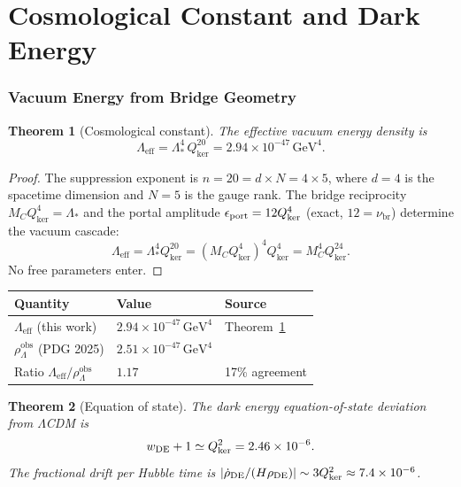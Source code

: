 \documentclass[12pt]{article}
\theoremstyle{plain}
\newtheorem{theorem}{Theorem}[section]
\theoremstyle{definition}
\numberwithin{equation}{section}
\newcommand{\br}{\mathrm{br}}
\newcommand{\eff}{\mathrm{eff}}
\newcommand{\obs}{\mathrm{obs}}
\begin{document}
\part{Cosmological Constant and Dark Energy}

\section{Vacuum Energy from Bridge Geometry}\label{sec:cosmo}

\begin{theorem}[Cosmological constant]\label{thm:cosmo}
The effective vacuum energy density is
\[
\boxed{\Lambda_\eff = \Lambda_*^4\, Q_{\ker}^{20}
= 2.94\times10^{-47}\,\mathrm{GeV}^4.}
\]
\end{theorem}

\begin{proof}
The suppression exponent is $n=20=d\times N=4\times5$, where $d=4$ is
the spacetime dimension and $N=5$ is the gauge rank.  The bridge reciprocity
$M_C Q_{\ker}^4=\Lambda_*$ and the portal amplitude $\epsilon_{\rm port}=
12Q_{\ker}^4$ (exact, $12=\nu_\br$) determine the vacuum cascade:
\[
\Lambda_\eff = \Lambda_*^4 Q_{\ker}^{20}
= (M_C Q_{\ker}^4)^4 Q_{\ker}^4 = M_C^4 Q_{\ker}^{24}.
\]
No free parameters enter.
\end{proof}

\begin{center}
\begin{tabular}{lll}
\toprule
Quantity & Value & Source\\
\midrule
$\Lambda_\eff$ (this work) & $2.94\times10^{-47}\,\mathrm{GeV}^4$ & Theorem~\ref{thm:cosmo}\\
$\rho_\Lambda^{\obs}$ (PDG 2025) & $2.51\times10^{-47}\,\mathrm{GeV}^4$ & \cite{PDG2025}\\
Ratio $\Lambda_\eff/\rho_\Lambda^{\obs}$ & $1.17$ & 17\% agreement\\
\bottomrule
\end{tabular}
\end{center}

\begin{theorem}[Equation of state]\label{thm:wDE}
The dark energy equation-of-state deviation from $\Lambda$CDM is
\[
w_{\rm DE}+1 \simeq Q_{\ker}^2 = 2.46\times10^{-6}.
\]
The fractional drift per Hubble time is $|\dot\rho_{\rm DE}/(H\rho_{\rm DE})|
\sim 3Q_{\ker}^2\approx7.4\times10^{-6}$.
\end{theorem}
\end{document}
